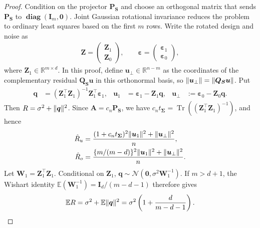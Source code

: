 \documentclass{article}
\theoremstyle{plain}
\theoremstyle{definition}
\theoremstyle{definition}
\newcommand{\boldzero}{\mathbf{0}}
\DeclarePairedDelimiter\norm{\lVert}{\rVert}
\DeclareMathOperator{\trace}{Tr}
\DeclareMathOperator{\diag}{\mathbf{diag}}
\def\R{{\mathbb{R}}}
\def\E{{\mathbb{E}}}
\def\mathbold{\boldsymbol}
\def\cal{\mathcal}
\def\bA{\mathbold{A}}\def\calA{{\cal A}}\def\scrA{{\mathscr A}}\def\Ahat{\widehat{A}}\def\Atil{{\widetilde A}}
\def\bI{\mathbold{I}}\def\hbI{{\widehat{\bI}}}\def\tbI{{\widetilde{\bI}}}
\def\calN{{\cal N}}\def\scrN{{\mathscr N}}\def\Nhat{\widehat{N}}\def\Ntil{{\widetilde N}}\def\Nbar{{\overline N}}
\def\bP{\mathbold{P}}\def\hbP{{\widehat{\bP}}}\def\tbP{{\widetilde{\bP}}}
\def\bq{\mathbold{q}}\def\qhat{\widehat{q}}\def\qtil{\widetilde{q}}\def\qbar{{\overline q}}
\def\bQ{\mathbold{Q}}\def\hbQ{{\widehat{\bQ}}}\def\tbQ{{\widetilde{\bQ}}}
\def\bS{\mathbold{S}}\def\hbS{{\widehat{\bS}}}\def\tbS{{\widetilde{\bS}}}
\def\bu{\mathbold{u}}\def\uhat{\widehat{u}}\def\util{\widetilde{u}}\def\ubar{{\overline u}}
\def\bW{\mathbold{W}}\def\hbW{{\widehat{\bW}}}\def\tbW{{\widetilde{\bW}}}
\def\bZ{\mathbold{Z}}\def\hbZ{{\widehat{\bZ}}}\def\tbZ{{\widetilde{\bZ}}}
\def\ep{\varepsilon}\def\eps{\epsilon}\def\veps{\varepsilon}
\def\bep{ {\mathbold{\ep} }}
\def\bSigma{\mathbold{\Sigma}}\def\hbSigma{{\widehat{\bSigma}}}
\newcommand{\hR}{\hat{R}}
\begin{document}
\begin{proof}
Condition on the projector $\bP_{\bS}$ and choose an orthogonal matrix that sends
$\bP_{\bS}$ to $\diag(\bI_m,\boldzero)$.  Joint Gaussian rotational invariance
reduces the problem to ordinary least squares based on the first $m$ rows.
Write the rotated design and noise as
\begin{align*}
    \bZ=\begin{pmatrix}\bZ_1\\\bZ_0\end{pmatrix},
    \qquad
    \bep=\begin{pmatrix}\bep_1\\\bep_0\end{pmatrix},
\end{align*}
where $\bZ_1\in\R^{m\times d}$.      In this proof, define
$\bu_\perp\in\R^{n-m}$ as the coordinates of the complementary residual
$\bQ_{\bS}\bu$ in this orthonormal basis, so
$\norm{\bu_\perp}=\norm{\bQ_{\bS}\bu}$. Put 
\begin{align*}
    \bq&=(\bZ_1^\top\bZ_1)^{-1}\bZ_1^\top\bep_1,
    & \bu_1&=\bep_1-\bZ_1\bq,
    &
    \bu_\perp&:=\bep_0-\bZ_0\bq.
\end{align*}
Then $R=\sigma^2+\norm{\bq}^2$.  Since $\bA=c_n\bP_{\bS}$, we have
$c_nt_{\bSigma}=\trace((\bZ_1^\top\bZ_1)^{-1})$, and hence
\begin{align*}
    \hR_u
    &=\frac{(1+c_nt_{\bSigma})^2\norm{\bu_1}^2+\norm{\bu_\perp}^2}{n},\\
    \hR_o
    &=\frac{\{m/(m-d)\}^2\norm{\bu_1}^2+\norm{\bu_\perp}^2}{n}.
\end{align*}
Let $\bW_1=\bZ_1^\top\bZ_1$.  Conditional on $\bZ_1$,
$\bq\sim\calN(\boldzero,\sigma^2\bW_1^{-1})$.  If $m>d+1$, the Wishart
identity $\E(\bW_1^{-1})=\bI_d/(m-d-1)$ therefore gives
\begin{align}
    \E R
    =\sigma^2+\E\norm{\bq}^2
    =\sigma^2\left(1+\frac{d}{m-d-1}\right).
    \label{eq:tight-frame-exact-risk}
\end{align}


\end{proof}
\end{document}

